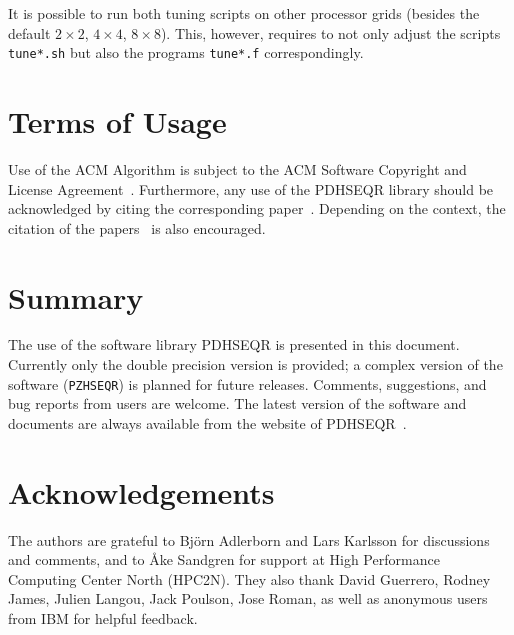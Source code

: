 \documentclass{article}
\begin{document}
It is possible to run both tuning scripts on other processor
grids (besides the default $2\times2$, $4\times4$, $8\times8$).
This, however, requires to not only adjust the scripts \texttt{tune*.sh} but also the
programs \texttt{tune*.f} correspondingly.


\section{Terms of Usage}
Use of the ACM Algorithm is subject to the ACM Software Copyright and License
Agreement~\cite{ACMSoftware}.
Furthermore, any use of the PDHSEQR library should be acknowledged by
citing the corresponding paper~\cite{GKKS2013}. Depending on the context, the
citation of the papers~\cite{GKK2009,GKK2010,KKS2012} is also encouraged.

\section{Summary}
The use of the software library PDHSEQR is presented in this document.
Currently only the double precision version is provided; a complex version of
the software (\texttt{PZHSEQR}) is planned for future releases.
Comments, suggestions, and bug reports from users are welcome.
The latest version of the software and documents are always available from the
website of PDHSEQR~\cite{home}.

\section*{Acknowledgements}
The authors are grateful to Bj\"orn Adlerborn and Lars Karlsson for
discussions and comments, and to {\AA}ke Sandgren for support at High
Performance Computing Center North (HPC2N).
They also thank David Guerrero, Rodney James, Julien Langou, Jack Poulson,
Jose Roman, as well as anonymous users from IBM for helpful feedback.
\end{document}
